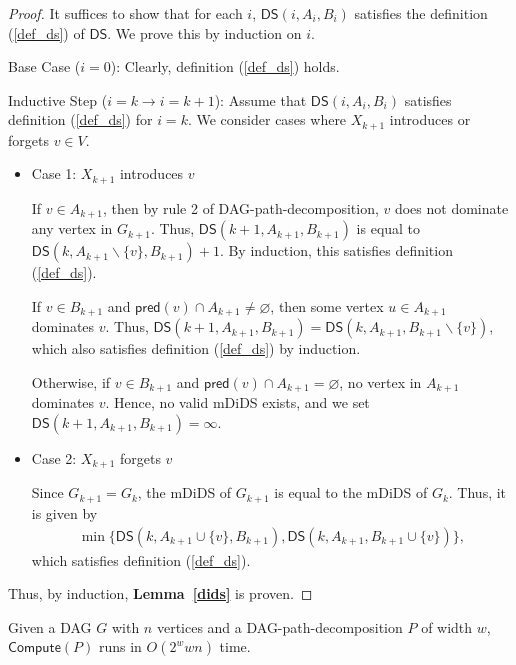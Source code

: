 \documentclass[runningheads]{llncs}
\theoremstyle{plain}
\theoremstyle{definition}
\begin{document}
\begin{proof}
    It suffices to show that for each $i$, $\mathsf{DS}(i, A_i, B_i)$ satisfies the definition (\ref{def_ds}) of $\mathsf{DS}$. We prove this by induction on $i$.
    
    Base Case ($i=0$): Clearly, definition (\ref{def_ds}) holds.
    
    Inductive Step ($i=k \rightarrow i=k+1$): Assume that $\mathsf{DS}(i, A_i, B_i)$ satisfies definition (\ref{def_ds}) for $i=k$. We consider cases where $X_{k+1}$ introduces or forgets $v \in V$.
    
    \begin{itemize}
        \item Case 1: $X_{k+1}$ introduces $v$
        
        If $v \in A_{k+1}$, then by rule 2 of DAG-path-decomposition, $v$ does not dominate any vertex in $G_{k+1}$. Thus, $\mathsf{DS}(k+1, A_{k+1}, B_{k+1})$ is equal to $\mathsf{DS}(k, A_{k+1} \backslash \{v\}, B_{k+1}) + 1$. By induction, this satisfies definition (\ref{def_ds}).
        
        If $v \in B_{k+1}$ and $\mathsf{pred}(v) \cap A_{k+1} \neq \varnothing$, then some vertex $u \in A_{k+1}$ dominates $v$. Thus, $\mathsf{DS}(k+1, A_{k+1}, B_{k+1}) = \mathsf{DS}(k, A_{k+1}, B_{k+1} \backslash \{v\})$, which also satisfies definition (\ref{def_ds}) by induction.
        
        Otherwise, if $v \in B_{k+1}$ and $\mathsf{pred}(v) \cap A_{k+1} = \varnothing$, no vertex in $A_{k+1}$ dominates $v$. Hence, no valid mDiDS exists, and we set $\mathsf{DS}(k+1, A_{k+1}, B_{k+1}) = \infty$.
        
        \item Case 2: $X_{k+1}$ forgets $v$
        
        Since $G_{k+1} = G_k$, the mDiDS of $G_{k+1}$ is equal to the mDiDS of $G_k$. Thus, it is given by
        \begin{align*}
            \min \{\mathsf{DS}(k, A_{k+1} \cup \{v\}, B_{k+1}), \mathsf{DS}(k, A_{k+1}, B_{k+1} \cup \{v\})\},
        \end{align*}
        which satisfies definition (\ref{def_ds}).
    \end{itemize}
    Thus, by induction, \textbf{Lemma~\ref{dids}} is proven.
\end{proof}

\begin{lemma}
    Given a DAG $G$ with $n$ vertices and a DAG-path-decomposition $P$ of width $w$, $\mathsf{Compute}(P)$ runs in $O(2^w w n)$ time.
\end{lemma}
\end{document}
